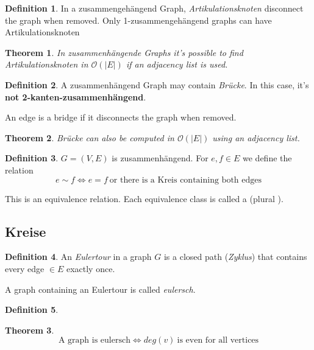 \documentclass[12pt]{extarticle}
\theoremstyle{definition}
\newtheorem{definition}{Definition}
\theoremstyle{remark}
\theoremstyle{plain}
\newtheorem{theorem}{Theorem}
\theoremstyle{plain}
\theoremstyle{plain}
\newcommand{\BO}{\mathcal{O}}
\begin{document}
\begin{definition}
    In a zusammengehängend Graph,
    \textit{Artikulationsknoten} disconnect the graph when removed.
    Only 1-zusammengehängend graphs can have Artikulationsknoten
\end{definition}

\begin{theorem}
    In zusammenhängende Graphs it's possible to find Artikulationsknoten in $\BO(|E|)$ if an adjacency list is used.
\end{theorem}

\begin{definition}
    A zusammenhängend Graph may contain \textit{Brücke}. In this case, it's \textbf{not 2-kanten-zusammenhängend}.

    An edge is a bridge if it disconnects the graph when removed.
\end{definition}

\begin{theorem}
    Brücke can also be computed in $\BO(|E|)$ using an adjacency list.
\end{theorem}

\begin{definition}
    $G = (V,E)$ is zusammenhängend. For $e,f \in E$ we define the relation
    \[ e \sim f \Leftrightarrow e = f\ \mbox{or there is a Kreis containing both edges} \]

    This is an equivalence relation. Each equivalence class is called a  (plural ).
\end{definition}

\subsection{Kreise}

\begin{definition}
    An \textit{Eulertour} in a graph $G$ is a closed path (\textit{Zyklus}) that contains every edge $\in E$ exactly once.

    A graph containing an Eulertour is called \textit{eulersch}.
\end{definition}

\begin{definition}

\end{definition}

\begin{theorem}
    \[ \mbox{A graph is eulersch} \Leftrightarrow deg(v)\ \mbox{is even for all vertices}\]
\end{theorem}
\end{document}
